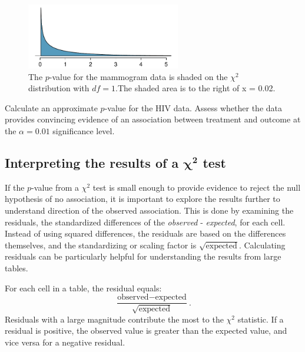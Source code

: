 \begin{figure}[h]
	\centering
	\includegraphics[width=0.6\textwidth]{ch_inference_for_props_oi_biostat/figures/mammogramPValue/mammogramPValue}
	\caption{The $p$-value for the mammogram data is shaded on the $\chi^2$ distribution with $df=1$.The shaded area is to the right of x = 0.02.}
	\label{mammogramPValue}
\end{figure}

\begin{exercisewrap}
\begin{nexercise}\label{hivDataPValue}%
Calculate an approximate $p$-value for the HIV data. Assess whether the data provides convincing evidence of an association between treatment and outcome at the $\alpha = 0.01$ significance level.\footnotemark{}
\end{nexercise}
\end{exercisewrap}


\textD{\newpage}


\subsection{Interpreting the results of a $\pmb{\chi^2}$ test}

If the $p$-value from a $\chi^2$ test is small enough to provide evidence to reject the null hypothesis of no association, it is important to explore the results further to understand direction of the observed association. This is done by examining the residuals, the standardized differences of the \emph{observed} - \emph{expected}, for each cell. Instead of using squared differences, the residuals are based on the differences themselves, and the standardizing or scaling factor is $\sqrt{\text{expected}}$.  Calculating residuals can be particularly helpful for understanding the results from large tables.


For each cell in a table, the residual equals:
\[\dfrac{\text{observed} - \text{expected}}{\sqrt{\text{expected}}}. \]
Residuals with a large magnitude contribute the most to the $\chi^2$ statistic. If a residual is positive, the observed value is greater than the expected value, and vice versa for a negative residual.

